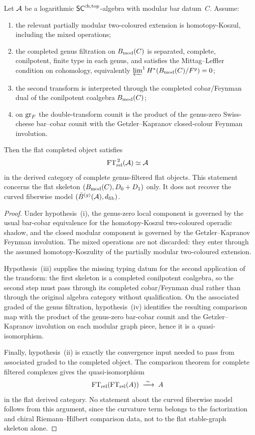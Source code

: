 \begin{theorem}
\label{thm:relative-ft-involutive}
Let $\mathcal{A}$ be a logarithmic $\mathsf{SC}^{\mathrm{ch,top}}$-algebra with modular bar
datum~$C$. Assume:
\begin{enumerate}[label=\textup{(\roman*)}]
\item the relevant partially modular two-coloured extension is
 homotopy-Koszul, including the mixed operations;
\item the completed genus filtration on $B_{\mathrm{mod}}(C)$ is separated,
 complete, conilpotent, finite type in each genus, and satisfies the
 Mittag--Leffler condition on
 cohomology, equivalently
 $\varprojlim^{1} H^\ast(B_{\mathrm{mod}}(C)/F^g)=0$;
\item the second transform is interpreted through the completed
 cobar/Feynman dual of the conilpotent coalgebra $B_{\mathrm{mod}}(C)$;
\item on $\mathrm{gr}_F$ the double-transform counit is the product of the
 genus-zero Swiss-cheese bar--cobar counit with the
 Getzler--Kapranov closed-colour Feynman involution.
\end{enumerate}
Then the flat completed object satisfies
\[
\mathrm{FT}_{\mathrm{rel}}^{\,2}(\mathcal{A})\simeq \mathcal{A}
\]
in the derived category of complete genus-filtered flat objects.
This statement concerns the flat skeleton
$(B_{\mathrm{mod}}(C),D_0+D_1)$ only. It does not recover the curved
fiberwise model $(\bar{B}^{(g)}(\mathcal{A}),d_{\mathrm{fib}})$.
\end{theorem}

\begin{proof}
Under hypothesis~(i), the genus-zero local component is governed
by the usual bar-cobar equivalence for the homotopy-Koszul
two-coloured operadic shadow, and the closed modular component is
governed by the Getzler--Kapranov Feynman involution. The mixed
operations are not discarded: they enter through the assumed
homotopy-Koszulity of the partially modular two-coloured extension.

Hypothesis~(iii) supplies the missing typing datum for the second
application of the transform: the first skeleton is a completed
conilpotent coalgebra, so the second step must pass through its
completed cobar/Feynman dual rather than through the original
algebra category without qualification. On the associated graded
of the genus filtration, hypothesis~(iv) identifies the resulting
comparison map with the product of the genus-zero bar-cobar counit
and the Getzler--Kapranov involution on each modular graph piece,
hence it is a quasi-isomorphism.

Finally, hypothesis~(ii) is exactly the convergence input needed
to pass from associated graded to the completed object. The
comparison theorem for complete filtered complexes gives the
quasi-isomorphism
\[
\mathrm{FT}_{\mathrm{rel}}(\mathrm{FT}_{\mathrm{rel}}(A))
\;\xrightarrow{\;\sim\;}\; A
\]
in the flat derived category. No statement about the curved
fiberwise model follows from this argument, since the curvature
term belongs to the factorization and chiral Riemann--Hilbert
comparison data, not to the flat stable-graph skeleton alone.
\end{proof}

